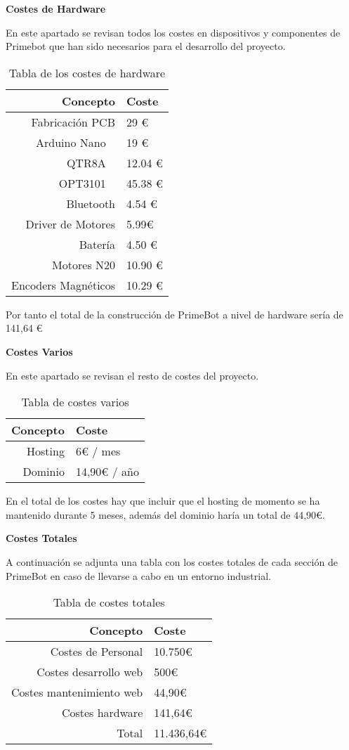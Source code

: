 \textbf{Costes de Hardware}

En este apartado se revisan todos los costes en dispositivos y componentes de Primebot que han sido necesarios para el desarrollo del proyecto.
 \begin{table}[h]
\begin{tabular}{| r | l |}
\hline
Concepto & Coste \\
\hline
Fabricación PCB & 29 € \\
\hline
Arduino Nano ~\cite{arduinoNanoEvery} & 19 € \\
\hline
QTR8A ~\cite{pololuQTR8A} & 12.04 € \\
\hline
OPT3101 ~\cite{pololuOPT3101} & 45.38 € \\
\hline
Bluetooth & 4.54 € \\
\hline
Driver de Motores & 5.99€ \\
\hline
Batería & 4.50 € \\
\hline
Motores N20 & 10.90 € \\
\hline
Encoders Magnéticos & 10.29 € \\
\hline
\end{tabular}
   \caption{Tabla de los costes de hardware}
   \label{A.4}
 \end{table}
 
Por tanto el total de la construcción de PrimeBot a nivel de hardware sería de 141,64 €

\textbf{Costes Varios}

En este apartado se revisan el resto de costes del proyecto.

 \begin{table}[h]
\begin{tabular}{| r | l |}
\hline
Concepto & Coste \\
\hline
Hosting & 6€ / mes \\
\hline
Dominio & 14,90€ / año \\
\hline
\end{tabular}
   \caption{Tabla de costes varios}
   \label{A.5}
 \end{table}
 
En el total de los costes hay que incluir que el hosting de momento se ha mantenido durante 5 meses, además del dominio haría un total de 44,90€.

\textbf{Costes Totales}

A continuación se adjunta una tabla con los costes totales de cada sección de PrimeBot en caso de llevarse a cabo en un entorno industrial.
 \begin{table}[h]
\begin{tabular}{| r | l |}
\hline
Concepto & Coste \\
\hline
Costes de Personal & 10.750€ \\
\hline
Costes desarrollo web & 500€ \\
\hline
Costes mantenimiento web & 44,90€ \\
\hline
Costes hardware & 141,64€ \\
\hline
Total & 11.436,64€ \\
\hline
\end{tabular}
   \caption{Tabla de costes totales}
   \label{A.6}
 \end{table}

